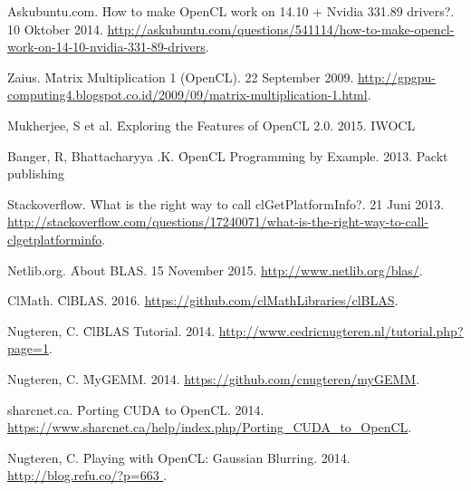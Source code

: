 %
% 

% 
% 
\begin{thebibliography}{4}

{Askubuntu.com. \f{How to make OpenCL work on 14.10 + Nvidia 331.89 drivers?}. 10 Oktober 2014. \url{http://askubuntu.com/questions/541114/how-to-make-opencl-work-on-14-10-nvidia-331-89-drivers}.}

{Zaius. \f{Matrix Multiplication 1 (OpenCL)}. 22 September 2009. \url{http://gpgpu-computing4.blogspot.co.id/2009/09/matrix-multiplication-1.html}.}

{Mukherjee, S et al. \f{Exploring the Features of OpenCL 2.0}. 2015. IWOCL }

{Banger, R, Bhattacharyya .K. \f{OpenCL Programming by Example}. 2013. Packt publishing }

{Stackoverflow. \f{What is the right way to call clGetPlatformInfo?}. 21 Juni 2013. \url{http://stackoverflow.com/questions/17240071/what-is-the-right-way-to-call-clgetplatforminfo}.}

{Netlib.org. \f{About BLAS}. 15 November 2015. \url{http://www.netlib.org/blas/​​}.}

{ClMath. \f{ClBLAS}. 2016. \url{https://github.com/clMathLibraries/clBLAS}.}

{Nugteren, C. \f{ClBLAS Tutorial}. 2014. \url{http://www.cedricnugteren.nl/tutorial.php?page=1}.}

{Nugteren, C. \f{MyGEMM}. 2014. \url{https://github.com/cnugteren/myGEMM}.}

{sharcnet.ca. \f{Porting CUDA to OpenCL}. 2014. \url{https://www.sharcnet.ca/help/index.php/Porting_CUDA_to_OpenCL}.}

{Nugteren, C. \f{Playing with OpenCL: Gaussian Blurring}. 2014. \url{ http://blog.refu.co/?p=663 }.}
​
\end{thebibliography}
